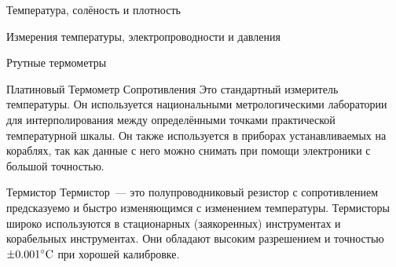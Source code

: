\begin{chapter}{Температура, солёность и плотность}
\begin{section}{Измерения температуры, электропроводности и давления}
\begin{paragraph}{Ртутные термометры}

\end{paragraph}

\begin{paragraph}{Платиновый Термометр Сопротивления} 
Это стандартный измеритель температуры. Он используется национальными
метрологическими лаборатории для интерполирования между определёнными
точками практической температурной шкалы. Он также используется в
приборах устанавливаемых на кораблях, так как данные с него можно
снимать при помощи электроники с большой точностью.
%
\end{paragraph}

\begin{paragraph}{Термистор}
Термистор~--- это полупроводниковый резистор с сопротивлением
предсказуемо и быстро изменяющимся с изменением
температуры. Термисторы широко используются в стационарных
(заякоренных) инструментах и корабельных инструментах. Они обладают
высоким разрешением и точностью~$\pm{0.001}^\circ\mbox{C}$ при хорошей
калибровке.
%
\end{paragraph}


\end{section}
\end{chapter}
